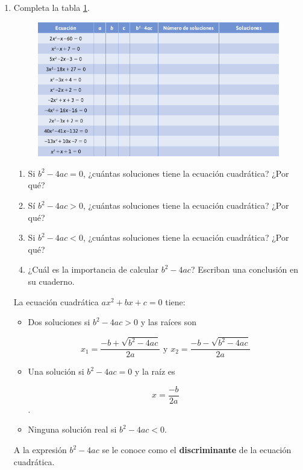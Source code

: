 \documentclass[11pt]{book}
\begin{document}
\begin{enumerate}
    \item Completa la tabla \ref{tab:table2.11}.

          \begin{figure}[H]
              \centering
              \includegraphics[width=\textwidth]{table2.11.png}
              \label{tab:table2.11}
          \end{figure}

          \begin{enumerate}
              \item Si $b^2 - 4ac = 0$, ¿cuántas soluciones tiene la ecuación cuadrática? ¿Por qué?
              \item Sí $b^2 - 4ac > 0$, ¿cuántas soluciones tiene la ecuación cuadrática? ¿Por qué?
              \item Si $b^2 - 4ac < 0$, ¿cuántas soluciones tiene la ecuación cuadrática? ¿Por qué?
              \item ¿Cuál es la importancia de calcular $b^2 - 4ac$? Escriban una conclusión en su cuaderno.
          \end{enumerate}

          \begin{boxH}
              La ecuación cuadrática $ax^2 + bx + c = 0$ tiene:
              \begin{itemize}
                  \item Dos soluciones si $b^2 - 4ac > 0$ y las raíces son

                        \[x_1 = \frac{-b + \sqrt{b^2 - 4ac}}{2a} \text{ y } x_2 = \frac{-b - \sqrt{b^2 - 4ac}}{2a}\]

                  \item Una solución si $b^2 - 4ac = 0$ y la raíz es

                        \[x = \frac{-b}{2a}\].

                  \item Ninguna solución real si $b^2 - 4ac < 0$.
              \end{itemize}

          \end{boxH}

          \begin{boxH}
              A la expresión \textbf{$b^2 - 4ac$} se le conoce como el \textbf{discriminante} de la ecuación
              cuadrática.
          \end{boxH}
\end{enumerate}
\end{document}
